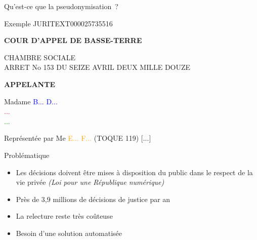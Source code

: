 \documentclass[10pt]{beamer}
\begin{document}
\begin{frame}{Qu'est-ce que la pseudonymisation~?}
\begin{block}{Exemple JURITEXT000025735516}
	\newline
	
	\textbf{COUR D'APPEL DE BASSE-TERRE}
	
	
	CHAMBRE SOCIALE \\
	ARRET No 153 DU SEIZE AVRIL DEUX MILLE DOUZE
	\newline
	
	\textbf{APPELANTE}
	
	Madame \textcolor{blue}{B... D...}\\
	\textcolor{red}{...}\\
	\textcolor{green}{...}
	
	Représentée par Me \textcolor{orange}{E... F...} (TOQUE 119) [...]
\end{block}
\end{frame}



\begin{frame}{Problématique}
\begin{itemize}	
	\item<1-> Les décisions doivent être mises à disposition du public dans le respect de la vie privée {\textit{(Loi pour une République numérique)}}
	\item<2-> Près de 3,9 millions de décisions de justice par an
	\item<3-> La relecture reste très coûteuse 
	\item<4-> Besoin d'une solution automatisée
\end{itemize}
\end{frame}
\end{document}
